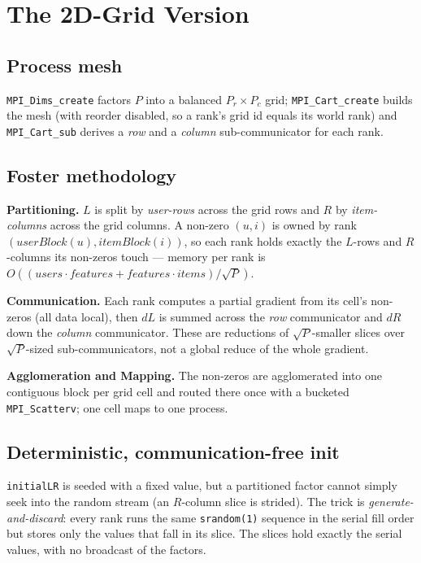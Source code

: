 \documentclass[twocolumn]{article}
\begin{document}
    \section{The 2D-Grid Version}\label{sec:grid}

    \subsection{Process mesh}\label{subsec:mesh}
    \texttt{MPI\_Dims\_create} factors $P$ into a balanced $P_r \times P_c$ grid;
    \texttt{MPI\_Cart\_create} builds the mesh (with reorder disabled, so a rank's grid id
    equals its world rank) and \texttt{MPI\_Cart\_sub} derives a \emph{row} and a
    \emph{column} sub-communicator for each rank.

    \subsection{Foster methodology}\label{subsec:foster}
    \textbf{Partitioning.} $L$ is split by \emph{user-rows} across the grid rows and $R$ by
    \emph{item-columns} across the grid columns. A non-zero $(u,i)$ is owned by rank
    $(\textit{userBlock}(u), \textit{itemBlock}(i))$, so each rank holds exactly the
    $L$-rows and $R$-columns its non-zeros touch --- memory per rank is
    $O((\textit{users} \cdot \textit{features} + \textit{features} \cdot
    \textit{items})/\sqrt{P})$.

    \textbf{Communication.} Each rank computes a partial gradient from its cell's
    non-zeros (all data local), then $dL$ is summed across the \emph{row} communicator and
    $dR$ down the \emph{column} communicator. These are reductions of $\sqrt{P}$-smaller
    slices over $\sqrt{P}$-sized sub-communicators, not a global reduce of the whole
    gradient.

    \textbf{Agglomeration and Mapping.} The non-zeros are agglomerated into one contiguous
    block per grid cell and routed there once with a bucketed \texttt{MPI\_Scatterv}; one
    cell maps to one process.

    \subsection{Deterministic, communication-free init}\label{subsec:init}
    \texttt{initialLR} is seeded with a fixed value, but a partitioned factor cannot simply
    seek into the random stream (an $R$-column slice is strided). The trick is
    \emph{generate-and-discard}: every rank runs the same \texttt{srandom(1)} sequence in
    the serial fill order but stores only the values that fall in its slice. The slices
    hold exactly the serial values, with no broadcast of the factors.
\end{document}
